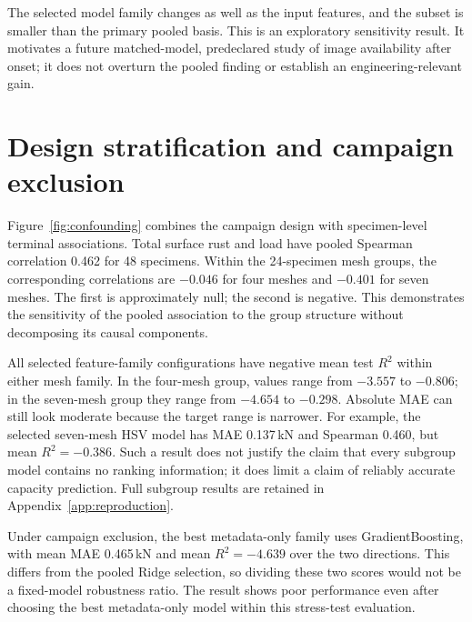 The selected model family changes as well as the input features, and the subset is smaller than the primary pooled basis. This is an exploratory sensitivity result. It motivates a future matched-model, predeclared study of image availability after onset; it does not overturn the pooled finding or establish an engineering-relevant gain.

\section{Design stratification and campaign exclusion}\label{sec:mesh}
Figure~\ref{fig:confounding} combines the campaign design with specimen-level terminal associations. Total surface rust and load have pooled Spearman correlation 0.462 for 48 specimens. Within the 24-specimen mesh groups, the corresponding correlations are $-0.046$ for four meshes and $-0.401$ for seven meshes. The first is approximately null; the second is negative. This demonstrates the sensitivity of the pooled association to the group structure without decomposing its causal components.


All selected feature-family configurations have negative mean test $R^2$ within either mesh family. In the four-mesh group, values range from $-3.557$ to $-0.806$; in the seven-mesh group they range from $-4.654$ to $-0.298$. Absolute MAE can still look moderate because the target range is narrower. For example, the selected seven-mesh HSV model has MAE 0.137\,kN and Spearman 0.460, but mean $R^2=-0.386$. Such a result does not justify the claim that every subgroup model contains no ranking information; it does limit a claim of reliably accurate capacity prediction. Full subgroup results are retained in Appendix~\ref{app:reproduction}.

Under campaign exclusion, the best metadata-only family uses GradientBoosting, with mean MAE 0.465\,kN and mean $R^2=-4.639$ over the two directions. This differs from the pooled Ridge selection, so dividing these two scores would not be a fixed-model robustness ratio. The result shows poor performance even after choosing the best metadata-only model within this stress-test evaluation.

